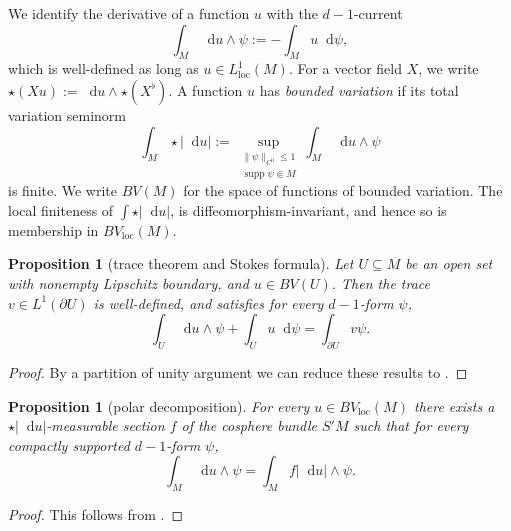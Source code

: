 \documentclass[reqno,11pt]{amsart}
\DeclareMathOperator{\supp}{supp}
\newcommand*\dif{\mathop{}\!\mathrm{d}}
\newcommand{\vol}{\mathrm{vol}}
\newcommand{\dfn}[1]{\emph{#1}\index{#1}}
\newcommand{\loc}{\mathrm{loc}}
\newtheorem{proposition}[theorem]{Proposition}
\theoremstyle{definition}
\numberwithin{equation}{section}
\begin{document}
We identify the derivative of a function $u$ with the $d-1$-current
$$\int_M \dif u \wedge \psi := -\int_M u \dif \psi,$$
which is well-defined as long as $u \in L^1_\loc(M)$.
For a vector field $X$, we write $\star (Xu) := \dif u \wedge \star (X^\flat)$.
A function $u$ has \dfn{bounded variation} if its total variation seminorm
\begin{equation}\label{total variation}
\int_M \star |\dif u| := \sup_{\substack{\|\psi\|_{C^0} \leq 1\\\supp \psi \Subset M}} \int_M \dif u \wedge \psi
\end{equation}
is finite. We write $BV(M)$ for the space of functions of bounded variation.
The local finiteness of $\int \star |\dif u|$, is diffeomorphism-invariant, and hence so is membership in $BV_\loc(M)$.

\begin{proposition}[trace theorem and Stokes formula]
Let $U \subseteq M$ be an open set with nonempty Lipschitz boundary, and $u \in BV(U)$.
Then the trace $v \in L^1(\partial U)$ is well-defined,
and satisfies for every $d - 1$-form $\psi$,
\begin{equation}\label{Miranda IBP}
\int_U \dif u \wedge \psi + \int_U u \dif \psi = \int_{\partial U} v\psi.
\end{equation}
\end{proposition}
\begin{proof}
By a partition of unity argument we can reduce these results to \cite[Teorema 1]{Miranda67}.
\end{proof}

\begin{proposition}[polar decomposition]
For every $u \in BV_\loc(M)$ there exists a $\star |\dif u|$-measurable section $f$ of the cosphere bundle $S'M$ such that for every compactly supported $d-1$-form $\psi$,
\begin{equation}\label{RNy formula}
\int_M \dif u \wedge \psi = \int_M f|\dif u| \wedge \psi.
\end{equation}
\end{proposition}
\begin{proof}
This follows from \cite[Theorem 4.14]{simon1983GMT}.
\end{proof}
\end{document}

